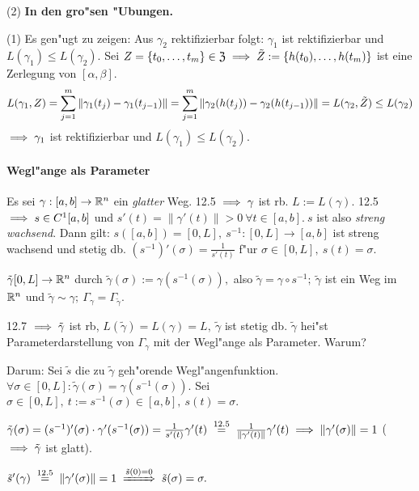 \documentclass[a4paper,twoside,DIV15,BCOR12mm,chapterprefix=true,headings=twolinechapter]{scrbook}
\begin{document}
\begin{beweise}
\item[(2)] \textbf{\color{red}In den gro"sen "Ubungen.}
\item[(1)] Es gen"ugt zu zeigen: Aus $\gamma_2$ rektifizierbar folgt: $\gamma_1$ ist rektifizierbar und $L(\gamma_1)\le L(\gamma_2)$. Sei $Z=\{t_0,\ldots,t_m\}\in\mathfrak{Z}\implies\tilde{Z}:=\{h(t_0),\ldots, h(t_m)\}$ ist eine Zerlegung von $[\alpha,\beta]$.
$$L(\gamma_1, Z)=\displaystyle\sum_{j=1}^m\|\gamma_1(t_j)-\gamma_1(t_{j-1})\|=\displaystyle\sum_{j=1}^m\|\gamma_2(h(t_j))-\gamma_2(h(t_{j-1}))\|=L(\gamma_2, \tilde{Z})\le L(\gamma_2)$$
$\implies \gamma_1$ ist rektifizierbar und $L(\gamma_1)\le L(\gamma_2)$.
\end{beweise}

\paragraph{Wegl"ange als Parameter}
Es sei $\gamma:[a,b]\to\mathbb{R}^n$ ein \emph{glatter} Weg. 12.5 $\implies \gamma$ ist rb. $L:=L(\gamma)$. 12.5 $\implies s \in C^1[a,b]$ und $s'(t) = \|\gamma'(t)\| > 0\ \forall t\in[a,b].\ s$ ist also \emph{streng wachsend}. Dann gilt: $s([a,b]) = [0,L],\ s^{-1}:[0,L]\to[a,b]$ ist streng wachsend und stetig db. $(s^{-1})'(\sigma) = \frac{1}{s'(t)}$ f"ur $\sigma \in [0,L],\ s(t) = \sigma.$

\begin{definition}
$\tilde{\gamma}[0,L] \to \mathbb{R}^n$ durch $\tilde{\gamma}(\sigma) := \gamma(s^{-1}(\sigma)),$ also $\tilde{\gamma} = \gamma\circ s^{-1};\ \tilde{\gamma}$ ist ein Weg im $\mathbb{R}^n$ und $\tilde{\gamma} \sim \gamma;\ \Gamma_\gamma = \Gamma_{\tilde{\gamma}}.$

12.7 $\implies \tilde{\gamma}$ ist rb, $L(\tilde{\gamma})=L(\gamma)=L,\ \tilde{\gamma}$ ist stetig db. $\tilde{\gamma}$ hei"st Parameterdarstellung von $\Gamma_\gamma$ mit der Wegl"ange als Parameter. Warum?
\end{definition}

Darum: Sei $\tilde{s}$ die zu $\tilde{\gamma}$ geh"orende Wegl"angenfunktion. $\forall \sigma\in[0,L]: \tilde{\gamma}(\sigma) = \gamma(s^{-1}(\sigma)).$ Sei $\sigma\in[0,L],\ t:= s^{-1}(\sigma) \in [a,b],\ s(t) = \sigma.$

$\tilde{\gamma}(\sigma) = (s^{-1})'(\sigma)\cdot\gamma'(s^{-1}(\sigma)) = \frac{1}{s'(t)}\gamma'(t) \gleichnach{12.5} \frac{1}{\|\gamma'(t)\|}\gamma'(t) \folgt \|\gamma'(\sigma)\|=1$ ($\implies \tilde{\gamma}$ ist glatt).

$\tilde{s}'(\gamma) \gleichnach{12.5} \|\gamma'(\sigma)\| = 1 \folgtwegen{\tilde{s}(0)=0} \tilde{s}(\sigma)=\sigma.$
\end{document}
